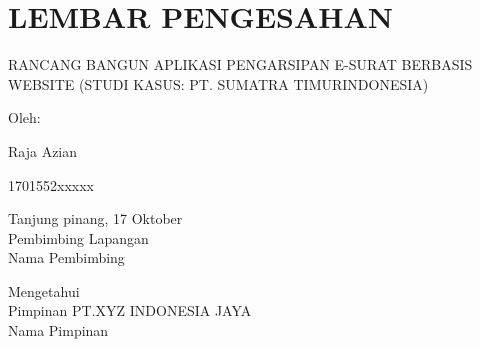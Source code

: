 \chapter*{\centering LEMBAR PENGESAHAN}

\thispagestyle{empty}


\begin{center}
    RANCANG BANGUN APLIKASI PENGARSIPAN E-SURAT BERBASIS WEBSITE (STUDI KASUS: PT. SUMATRA TIMURINDONESIA)
\end{center}

\vspace{1cm}

\begin{center}
    Oleh:
    \begin{multicols}{2}
        {Raja Azian}

        {1701552xxxxx}
    \end{multicols}

    \vspace{1cm}

    Tanjung pinang, 17 Oktober \the\year{}\\
    Pembimbing Lapangan \\
    \vspace{2cm}
    Nama Pembimbing \\

    \vspace{2.75cm}

    Mengetahui\\
    Pimpinan PT.XYZ INDONESIA JAYA \\
    \vspace{2cm}
    Nama Pimpinan
\end{center}
\newpage
